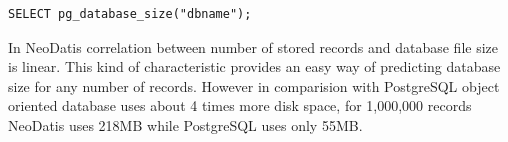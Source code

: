 \documentclass[a4paper,titlepage,12pt]{article}
\begin{document}
\begin{lstlisting}[caption=PostgeSQL database size]
SELECT pg_database_size("dbname");
\end{lstlisting}


In NeoDatis correlation between number of stored records and database file size is linear. This kind of characteristic provides an easy way of predicting database size for any number of records. However in comparision with PostgreSQL object oriented database uses about 4 times more disk space, for 1,000,000 
records NeoDatis uses 218MB while PostgreSQL uses only 55MB.
\end{document}
